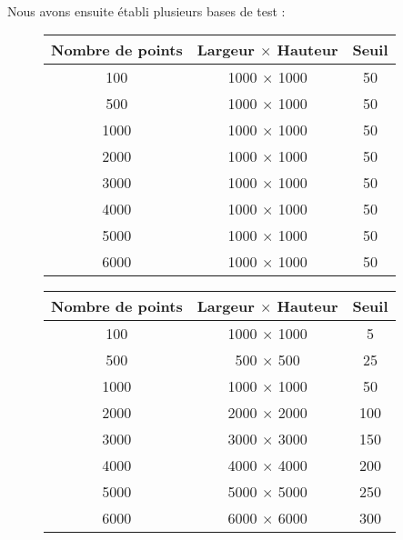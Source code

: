 \paragraph{}
Nous avons ensuite établi plusieurs bases de test :

\begin{figure}[ht]
\begin{center}
\begin{tabular}{|*{3}{c|}}
    \hline
     Nombre de points  & Largeur $\times$ Hauteur  & Seuil \\
    \hline
    100  & 1000 $\times$ 1000 & 50 \\
    \hline
    500  & 1000 $\times$ 1000  & 50 \\
    \hline
    1000  & 1000 $\times$ 1000  & 50 \\
    \hline
    2000  & 1000 $\times$ 1000  & 50 \\
    \hline
    3000  & 1000 $\times$ 1000  & 50 \\
    \hline
    4000  & 1000 $\times$ 1000  & 50 \\
    \hline
    5000  & 1000 $\times$ 1000  & 50 \\
    \hline
    6000  & 1000 $\times$ 1000  & 50 \\
    \hline
\end{tabular}
\end{center}
\end{figure}

\begin{figure}[ht]
\begin{center}
\begin{tabular}{|*{3}{c|}}
    \hline
     Nombre de points  & Largeur $\times$ Hauteur  & Seuil \\
    \hline
    100  & 1000 $\times$ 1000 & 5 \\
    \hline
    500  & 500 $\times$ 500  & 25 \\
    \hline
    1000  & 1000 $\times$ 1000  & 50 \\
    \hline
    2000  & 2000 $\times$ 2000  & 100 \\
    \hline
    3000  & 3000 $\times$ 3000  & 150 \\
    \hline
    4000  & 4000 $\times$ 4000  & 200 \\
    \hline
    5000  & 5000 $\times$ 5000  & 250 \\
    \hline
    6000  & 6000 $\times$ 6000  & 300 \\
    \hline
\end{tabular}
\end{center}
\end{figure}

